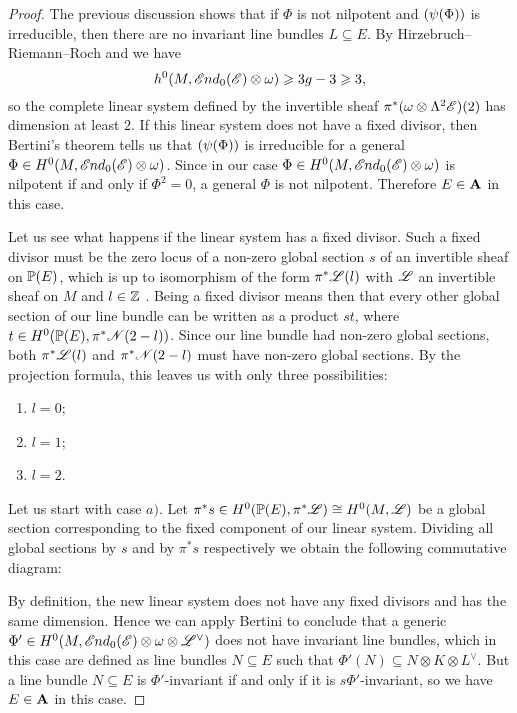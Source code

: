 \documentclass[A4paper, 12pt, british, reqno]{amsart}
\let\div\relax
\DeclareMathOperator{\div}{div}
\newcommand{\ot}{\otimes}
\newcommand{\dual}{^{\vee}}
\begin{document}
\begin{lm}
\begin{proof}
	The previous discussion shows that if $\Phi$ is not nilpotent and $\div(\psi(\Phi))$ is irreducible, then there are no invariant line bundles $L\subseteq E$.
	By Hirzebruch--Riemann--Roch and  we have
	\[ h^{0}(M,\sEnd_{0}(\E)\ot \w)\geqslant 3g-3\geqslant 3, \]
	so the complete linear system defined by the invertible sheaf $\pi^{*}(\w\ot\Lambda^{2}\E)(2)$ has dimension at least $2$.
	If this linear system does not have a fixed divisor, then Bertini's theorem \cite[Theorem 7.19]{iit82} tells us that $\div(\psi(\Phi))$ is irreducible for a general $\Phi\in H^{0}(M,\sEnd_{0}(\E)\ot \w)$.
	Since in our case $\Phi\in H^{0}(M,\sEnd_{0}(\E)\ot \w)$ is nilpotent if and only if $\Phi^{2}=0$, a general $\Phi$ is not nilpotent.
	Therefore $E\in \bfA$ in this case.

	Let us see what happens if the linear system has a fixed divisor.
	Such a fixed divisor must be the zero locus of a non-zero global section $s$ of an invertible sheaf on $\P(E)$, which is up to isomorphism of the form $\pi^{*}\L(l)$ with $\L$ an invertible sheaf on $M$ and $l\in \Z$ \cite[Exercise II.7.9]{har77}.
	Being a fixed divisor means then that every other global section of our line bundle can be written as a product $st$, where $t\in H^{0}(\P(E),\pi^{*}\sN(2-l))$.
	Since our line bundle had non-zero global sections, both $\pi^{*}\L(l)$ and $\pi^{*}\sN(2-l)$ must have non-zero global sections.
	By the projection formula, this leaves us with only three possibilities:
	\begin{enumerate}[label=\alph*)]
	    \item $l=0$;
	    \item $l=1$;
	    \item $l=2$.
	\end{enumerate}
	Let us start with case $a)$.
	Let $\pi^{*}s\in H^{0}(\P(E),\pi^{*}\L)\cong H^{0}(M,\L)$ be a global section corresponding to the fixed component of our linear system.
	Dividing all global sections by $s$ and by $\pi^{*}s$ respectively we obtain the following commutative diagram:
	\begin{center}
	\end{center}
	By definition, the new linear system does not have any fixed divisors and has the same dimension.
	Hence we can apply Bertini to conclude that a generic $\Phi'\in H^{0}(M,\sEnd_{0}(\E)\ot \w\ot \L\dual)$ does not have invariant line bundles, which in this case are defined as line bundles $N\subseteq E$ such that $\Phi'(N)\subseteq N\ot K\ot L\dual$.
	But a line bundle $N\subseteq E$ is $\Phi'$-invariant if and only if it is $s\Phi'$-invariant, so we have $E\in \bfA$ in this case.


\end{proof}
\end{lm}
\end{document}
